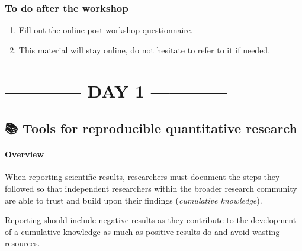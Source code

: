 \documentclass[
  letterpaper,
  DIV=11,
  numbers=noendperiod]{scrreprt}
\providecommand{\tightlist}{%
  \setlength{\itemsep}{0pt}\setlength{\parskip}{0pt}}\usepackage{longtable,booktabs,array}
\begin{document}
\hypertarget{to-do-after-the-workshop}{%
\section{To do after the workshop}\label{to-do-after-the-workshop}}

\begin{enumerate}
\def\labelenumi{\arabic{enumi}.}
\tightlist
\item
  Fill out the online post-workshop questionnaire.
\item
  This material will stay online, do not hesitate to refer to it if
  needed.
\end{enumerate}

\part{------------ DAY 1 ------------}

\hypertarget{tools-for-reproducible-quantitative-research}{%
\chapter{\texorpdfstring{{📚} Tools for reproducible quantitative
research}{📚 Tools for reproducible quantitative research}}\label{tools-for-reproducible-quantitative-research}}

\hypertarget{overview}{%
\subsection{Overview}\label{overview}}

When reporting scientific results, researchers must document the steps
they followed so that independent researchers within the broader
research community are able to trust and build upon their findings
(\emph{cumulative knowledge}).

\begin{tcolorbox}[enhanced jigsaw, colframe=quarto-callout-important-color-frame, colback=white, rightrule=.15mm, bottomrule=.15mm, left=2mm, arc=.35mm, coltitle=black, title=\textcolor{quarto-callout-important-color}{\faExclamation}\hspace{0.5em}{Important}, opacitybacktitle=0.6, bottomtitle=1mm, opacityback=0, toptitle=1mm, toprule=.15mm, colbacktitle=quarto-callout-important-color!10!white, titlerule=0mm, leftrule=.75mm, breakable]
Reporting should include negative results as they contribute to the
development of a cumulative knowledge as much as positive results do and
avoid wasting resources.
\end{tcolorbox}
\end{document}
